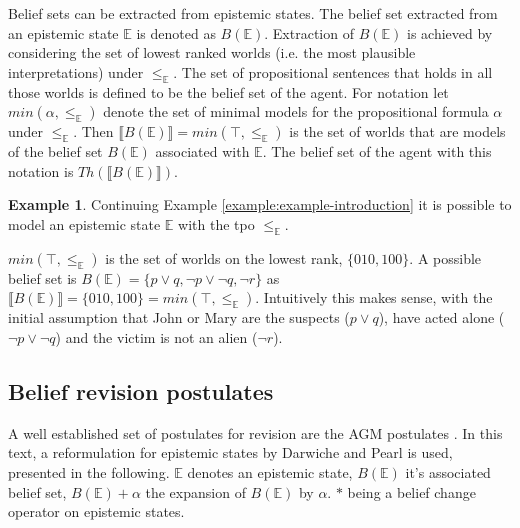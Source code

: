 \documentclass[english, 12pt]{scrartcl}
\theoremstyle{definition}
\newtheorem{example}{Example}
\theoremstyle{definition}
\theoremstyle{definition}
\newcommand{\modelsOf}[1]{\llbracket #1 \rrbracket}
\begin{document}
Belief sets can be extracted from epistemic states. The belief set extracted from an epistemic state $\mathbb{E}$ is denoted as $B(\mathbb{E})$. Extraction of $B(\mathbb{E})$ is achieved by considering the set of lowest ranked worlds (i.e. the most plausible interpretations) under $\leq_{\mathbb{E}}$. The set of propositional sentences that holds in all those worlds is defined to be the belief set of the agent. For notation let $min(\alpha, \leq_{\mathbb{E}})$ denote the set of minimal models for the propositional formula $\alpha$ under $\leq_{\mathbb{E}}$. Then $\modelsOf{B(\mathbb{E})} = min(\top, \leq_{\mathbb{E}})$ is the set of worlds that are models of the belief set $B(\mathbb{E})$ associated with $\mathbb{E}$. The belief set of the agent with this notation is $Th(\modelsOf{B(\mathbb{E})})$.

\begin{example}
    Continuing Example \ref{example:example-introduction} it is possible to model an epistemic state $\mathbb{E}$ with the tpo $\leq_{\mathbb{E}}$.
    
    $min(\top, \leq_{\mathbb{E}})$ is the set of worlds on the lowest rank, $\{010, 100\}$. A possible belief set is $B(\mathbb{E}) = \{p \vee q, \neg p \vee \neg q, \neg r\}$ as $\modelsOf{B(\mathbb{E})} = \{010, 100\} = min(\top, \leq_{\mathbb{E}})$. Intuitively this makes sense, with the initial assumption that John or Mary are the suspects ($p \vee q$), have acted alone ($\neg p \vee \neg q$) and the victim is not an alien ($\neg r$).
\end{example}

\subsection{Belief revision postulates}
\label{chapter:dp-agm-postulates}
A well established set of postulates for revision are the AGM postulates \cite{Alchourron1985}. In this text, a reformulation for epistemic states by Darwiche and Pearl \cite{Darwiche1997} is used, presented in the following. $\mathbb{E}$ denotes an epistemic state, $B(\mathbb{E})$ it's associated belief set, $B(\mathbb{E}) + \alpha$ the expansion of $B(\mathbb{E})$ by $\alpha$. $\ast$ being a belief change operator on epistemic states. 
\end{document}
